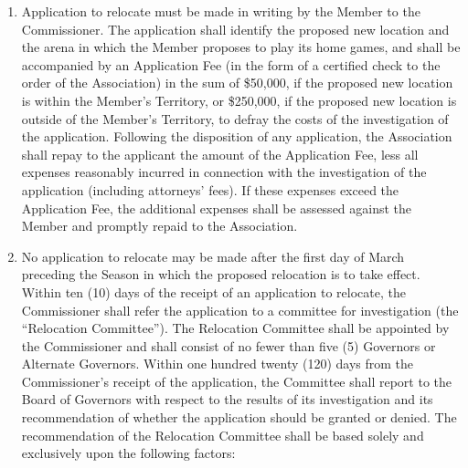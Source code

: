 \documentclass[]{book}
\providecommand{\tightlist}{%
  \setlength{\itemsep}{0pt}\setlength{\parskip}{0pt}}
\begin{document}
\begin{enumerate}
\def\labelenumi{(\alph{enumi})}
\tightlist
\item
  Application to relocate must be made in writing by the Member to the Commissioner. The application shall identify the proposed new location and the arena in which the Member proposes to play its home games, and shall be accompanied by an Application Fee (in the form of a certified check to the order of the Association) in the sum of \$50,000, if the proposed new location is within the Member's Territory, or \$250,000, if the proposed new location is outside of the Member's Territory, to defray the costs of the investigation of the application. Following the disposition of any application, the Association shall repay to the applicant the amount of the Application Fee, less all expenses reasonably incurred in connection with the investigation of the application (including attorneys' fees). If these expenses exceed the Application Fee, the additional expenses shall be assessed against the Member and promptly repaid to the Association.
\item
  No application to relocate may be made after the first day of March preceding the Season in which the proposed relocation is to take effect. Within ten (10) days of the receipt of an application to relocate, the Commissioner shall refer the application to a committee for investigation (the ``Relocation Committee''). The Relocation Committee shall be appointed by the Commissioner and shall consist of no fewer than five (5) Governors or Alternate Governors. Within one hundred twenty (120) days from the Commissioner's receipt of the application, the Committee shall report to the Board of Governors with respect to the results of its investigation and its recommendation of whether the application should be granted or denied. The recommendation of the Relocation Committee shall be based solely and exclusively upon the following factors:


\end{enumerate}
\end{document}
